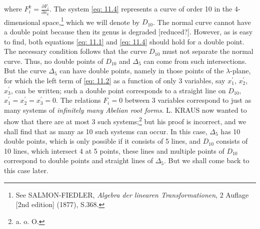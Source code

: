 \documentclass[leqno]{article}
\begin{document}
where $F_i^k = \frac{\partial F_i}{\partial x_k}$. The system \eqref{eq: 11.4} represents a curve of order 10 in the 4-dimensional space,\footnote{See SALMON-FIEDLER, \textit{Algebra der linearen Transformationen}, 2 Auflage [2nd edition] (1877), S.368.} which we will denote by $D_{10}$. The normal curve cannot have a double point because then its genus is degraded [reduced?]. However, as is easy to find, both equations \eqref{eq: 11.1} and \eqref{eq: 11.4} should hold for a double point. The necessary condition follows that the curve $D_{10}$ must not separate the normal curve. Thus, no double points of $D_{10}$ and $\Delta_5$ can come from such intersections. But the curve $\Delta_5$ can have double points, namely in those points of the $\lambda$-plane, for which the left term of \eqref{eq: 11.2} as a function of only 3 variables, say $x_1^\prime$, $x_2^\prime$, $x_3^\prime$, can be written; such a double point corresponds to a straight line on $D_{10}$, $x_1^\prime=x_2^\prime=x_3^\prime=0$. The relations $F_i=0$ between 3 variables correspond to just as many systems of \textit{infinitely many Abelian root forms}. L. KRAUS now wanted to show that there are at most 3 such systems;\footnote{a. o. O.} but his proof is incorrect, and we shall find that as many as 10 such systems can occur. In this case, $\Delta_5$ has 10 double points, which is only possible if it consists of 5 lines, and $D_{10}$ consists of 10 lines, which intersect 4 at 5 points, these lines and multiple points of $D_{10}$ correspond to double points and straight lines of $\Delta_5$. But we shall come back to this case later. \\
\end{document}
